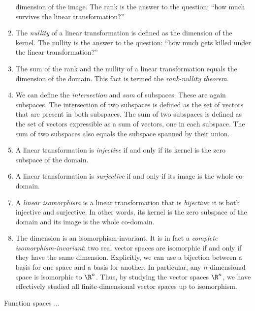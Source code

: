 \documentclass[10pt]{amsart}
\begin{document}
\begin{enumerate}
  dimension of the image. The rank is the answer to the question:
  ``how much survives the linear transformation?''
\item The {\em nullity} of a linear transformation is defined as the
  dimension of the kernel. The nullity is the answer to the question:
  ``how much gets killed under the linear transformation?''
\item The sum of the rank and the nullity of a linear transformation
  equals the dimension of the domain. This fact is termed the {\em
    rank-nullity theorem}.
\item We can define the {\em intersection} and {\em sum} of
  subspaces. These are again subspaces. The intersection of two
  subspaces is defined as the set of vectors that are present in both
  subspaces. The sum of two subspaces is defined as the set of vectors
  expressible as a sum of vectors, one in each subspace. The sum of
  two subspaces also equals the subspace spanned by their union.
\item A linear transformation is {\em injective} if and only if its
  kernel is the zero subspace of the domain.
\item A linear transformation is {\em surjective} if and only if its
  image is the whole co-domain.
\item A {\em linear isomorphism} is a linear transformation that is
  {\em bijective}: it is both injective and surjective. In other
  words, its kernel is the zero subspace of the domain and its image
  is the whole co-domain.
\item The dimension is an isomorphism-invariant. It is in fact a {\em
  complete isomorphism-invariant}: two real vector spaces are
  isomorphic if and only if they have the same dimension. Explicitly,
  we can use a bijection between a basis for one space and a basis for
  another. In particular, any $n$-dimensional space is isomorphic to
  $\R^n$. Thus, by studying the vector spaces $\R^n$, we have
  effectively studied all finite-dimensional vector spaces up to
  isomorphism.
\end{enumerate}

Function spaces ...
\end{document}
